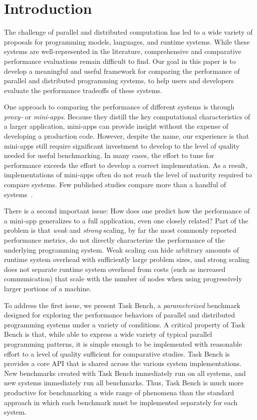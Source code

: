 \section{Introduction}
\label{sec:introduction}

The challenge of parallel and distributed computation has led to a
wide variety of proposals for programming models, languages, and
runtime systems. While these systems are well-represented in the literature, comprehensive and comparative performance evaluations
remain difficult to find. Our
goal in this paper is to develop a meaningful and useful framework for
comparing the performance of parallel and distributed programming
systems, to help users and developers evaluate the performance tradeoffs of these systems.

One approach to comparing the performance of different systems is through \emph{proxy-} or
\emph{mini-apps}. Because they distill the key computational characteristics of a larger
application, mini-apps can provide insight
without the expense of developing a production code. However, despite the name, our experience is that
mini-apps still require significant investment to develop
to the level of quality needed for useful benchmarking. In many cases,
the effort to tune for performance exceeds the effort to develop a correct implementation. As a result, implementations of mini-apps
often do not reach the level of maturity required to compare
systems. Few published studies compare more than a handful of systems~\cite{LULESH13}.

There is a second important issue: How does one predict how
the performance of a mini-app generalizes to a full
application, even one closely related? Part of the problem is
that \emph{weak} and \emph{strong} scaling, by far the most commonly
reported performance metrics,
do not directly characterize the performance of the underlying
programming system. Weak scaling can hide arbitrary amounts of runtime
system overhead with sufficiently large problem sizes, and strong
scaling does not separate runtime system overhead from costs
(such as increased communication) that scale with the number of nodes when
using progressively larger portions of a machine.

To address the first issue, we present Task Bench, a
\emph{parameterized} benchmark designed for exploring the performance
behaviors of parallel and distributed programming systems under a
variety of conditions. A critical property of Task Bench is that,
while able to express a wide variety of typical parallel programming
patterns, it is simple enough to be implemented with reasonable effort
to a level of quality sufficient for comparative
studies. Task Bench is provides a core API that is shared across the
various system implementations. New benchmarks created with Task Bench
immediately run on all systems, and new systems immediately run all
benchmarks. Thus, Task Bench is much more productive for benchmarking
a wide range of phenomena than the standard approach in which each
benchmark must be implemented separately for each system.

